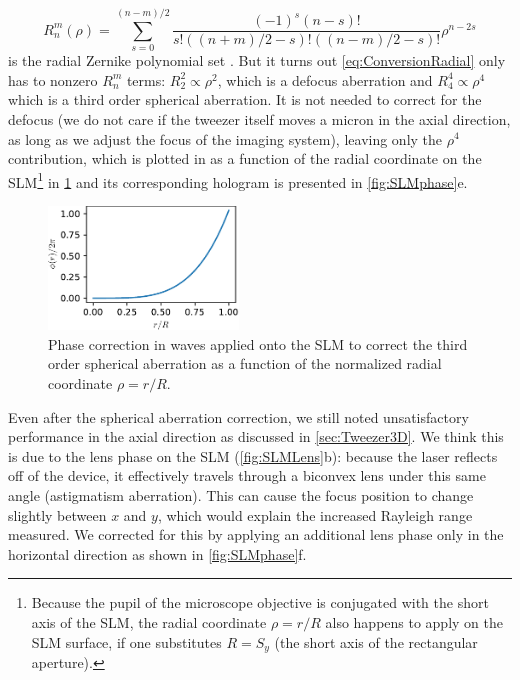 \begin{equation}\label{eq:ZernikeRadial}
    R_{n}^{m}(\rho)=
    \sum_{s=0}^{(n-m) / 2}
    \frac{(-1)^{s}(n-s) !}{s !\left((n+m)/2-s\right) !\left((n-m)/2-s\right) !} \rho^{n-2 s}
\end{equation}
is the radial Zernike polynomial set \cite{Mahajan94}. But it turns out \cref{eq:ConversionRadial} only has to nonzero $R_n^m$ terms: $R_2^2 \propto \rho^2$, which is a defocus aberration and $R_4^4 \propto \rho^4$ which is a third order spherical aberration. 
It is not needed to correct for the defocus (we do not care if the tweezer itself moves a micron in the axial direction, as long as we adjust the focus of the imaging system), leaving only the $\rho^4$ contribution, which is plotted in as a function of the radial coordinate on the SLM\footnote{Because the pupil of the microscope objective is conjugated with the short axis of the SLM, the radial coordinate $\rho =r/R$ also happens to apply on the SLM surface, if one substitutes $R=S_y$ (the short axis of the rectangular aperture).} in \cref{fig:AberrationTerm} and its corresponding hologram is presented in \cref{fig:SLMphase}e.

\begin{figure}
    \centering
    \includegraphics[width=0.45\textwidth]{figures/SphericalAberrationTerm.pdf}
    \caption{Phase correction in waves applied onto the SLM to correct the third order spherical aberration as a function of the normalized radial coordinate $\rho=r/R$.}
    \label{fig:AberrationTerm}
\end{figure}

Even after the spherical aberration correction, we still noted unsatisfactory performance in the axial direction as discussed in \cref{sec:Tweezer3D}. 
We think this is due to the lens phase on the SLM (\cref{fig:SLMLens}b): because the laser reflects off of the device, it effectively travels through a biconvex lens under this same angle (astigmatism aberration). 
This can cause the focus position to change slightly between $x$ and $y$, which would explain the increased Rayleigh range measured. 
We corrected for this by applying an additional lens phase only in the horizontal direction as shown in \cref{fig:SLMphase}f.


